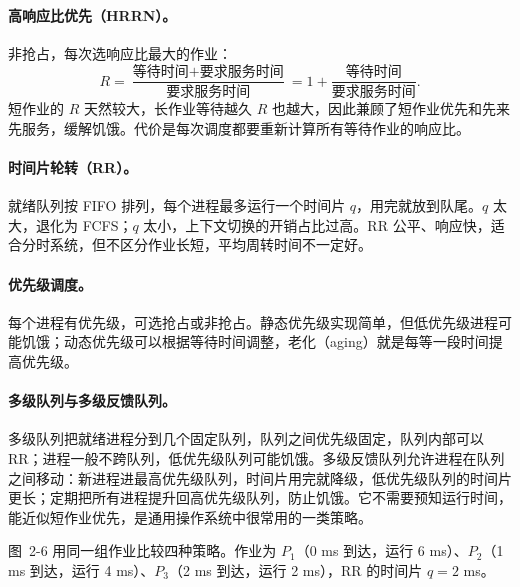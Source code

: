 \paragraph{高响应比优先（HRRN）。} 非抢占，每次选响应比最大的作业：
\[
R=\frac{\text{等待时间}+\text{要求服务时间}}{\text{要求服务时间}}
=1+\frac{\text{等待时间}}{\text{要求服务时间}}.
\]
短作业的 $R$ 天然较大，长作业等待越久 $R$ 也越大，因此兼顾了短作业优先和先来先服务，缓解饥饿。代价是每次调度都要重新计算所有等待作业的响应比。

\paragraph{时间片轮转（RR）。} 就绪队列按 FIFO 排列，每个进程最多运行一个时间片 $q$，用完就放到队尾。$q$ 太大，退化为 FCFS；$q$ 太小，上下文切换的开销占比过高。RR 公平、响应快，适合分时系统，但不区分作业长短，平均周转时间不一定好。

\paragraph{优先级调度。} 每个进程有优先级，可选抢占或非抢占。静态优先级实现简单，但低优先级进程可能饥饿；动态优先级可以根据等待时间调整，老化（aging）就是每等一段时间提高优先级。

\paragraph{多级队列与多级反馈队列。} 多级队列把就绪进程分到几个固定队列，队列之间优先级固定，队列内部可以 RR；进程一般不跨队列，低优先级队列可能饥饿。多级反馈队列允许进程在队列之间移动：新进程进最高优先级队列，时间片用完就降级，低优先级队列的时间片更长；定期把所有进程提升回高优先级队列，防止饥饿。它不需要预知运行时间，能近似短作业优先，是通用操作系统中很常用的一类策略。

图~2-6 用同一组作业比较四种策略。作业为 $P_1$（0 ms 到达，运行 6 ms）、$P_2$（1 ms 到达，运行 4 ms）、$P_3$（2 ms 到达，运行 2 ms），RR 的时间片 $q=2$ ms。

